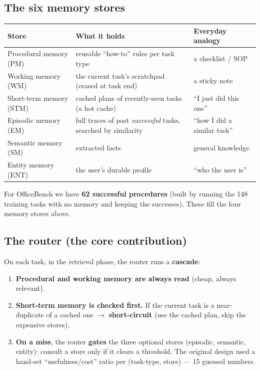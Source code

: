 \documentclass[11pt]{article}
\begin{document}
\subsection{The six memory stores}
\begin{center}
\begin{tabular}{@{}llp{6.0cm}@{}}
\toprule
Store & What it holds & Everyday analogy \\
\midrule
Procedural memory (PM)  & reusable ``how-to'' rules per task type & a checklist / SOP \\
Working memory (WM)     & the current task's scratchpad (erased at task end) & a sticky note \\
Short-term memory (STM) & cached plans of recently-seen tasks (a hot cache) & ``I just did this one'' \\
Episodic memory (EM)    & full traces of past \emph{successful} tasks, searched by similarity & ``how I did a similar task'' \\
Semantic memory (SM)    & extracted facts & general knowledge \\
Entity memory (ENT)     & the user's durable profile & ``who the user is'' \\
\bottomrule
\end{tabular}
\end{center}
For OfficeBench we have \textbf{62 successful procedures} (built by running the 148 training tasks with no
memory and keeping the successes). These fill the four memory stores above.

\subsection{The router (the core contribution)}
On each task, in the retrieval phase, the router runs a \textbf{cascade}:
\begin{enumerate}[leftmargin=1.6em,itemsep=1pt]
\item \textbf{Procedural and working memory are always read} (cheap, always relevant).
\item \textbf{Short-term memory is checked first.} If the current task is a near-duplicate of a cached
one $\to$ \textbf{short-circuit} (use the cached plan, skip the expensive stores).
\item \textbf{On a miss}, the router \textbf{gates} the three optional stores (episodic, semantic,
entity): consult a store only if it clears a threshold. The original design used a hand-set
``usefulness/cost'' ratio per (task-type, store) --- 15 guessed numbers.
\end{enumerate}
\end{document}
